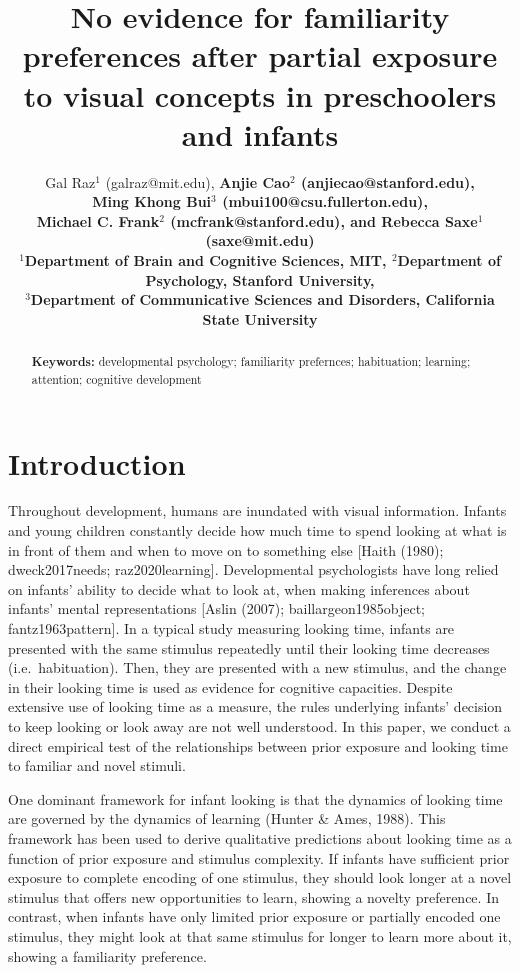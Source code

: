 \documentclass[10pt, letterpaper]{article}
\title{No evidence for familiarity preferences after partial exposure to
visual concepts in preschoolers and infants}
\author{Gal Raz$^1$ (galraz@mit.edu), \bf{Anjie Cao$^2$  (anjiecao@stanford.edu)},\\ \bf{Ming Khong Bui$^3$  (mbui100@csu.fullerton.edu)},\\ \bf{Michael C. Frank$^2$ (mcfrank@stanford.edu)},
 and \bf{Rebecca Saxe$^1$ (saxe@mit.edu)} \\
$^1$Department of Brain and Cognitive Sciences, MIT, $^2$Department of Psychology, Stanford University, \\ $^3$Department of Communicative Sciences and Disorders, California State University \\
}
\begin{document}
\maketitle

\begin{abstract}


\textbf{Keywords:}
developmental psychology; familiarity prefernces; habituation; learning;
attention; cognitive development
\end{abstract}

\hypertarget{introduction}{%
\section{Introduction}\label{introduction}}

Throughout development, humans are inundated with visual information.
Infants and young children constantly decide how much time to spend
looking at what is in front of them and when to move on to something
else {[}Haith (1980); dweck2017needs; raz2020learning{]}. Developmental
psychologists have long relied on infants' ability to decide what to
look at, when making inferences about infants' mental representations
{[}Aslin (2007); baillargeon1985object; fantz1963pattern{]}. In a
typical study measuring looking time, infants are presented with the
same stimulus repeatedly until their looking time decreases
(i.e.~habituation). Then, they are presented with a new stimulus, and
the change in their looking time is used as evidence for cognitive
capacities. Despite extensive use of looking time as a measure, the
rules underlying infants' decision to keep looking or look away are not
well understood. In this paper, we conduct a direct empirical test of
the relationships between prior exposure and looking time to familiar
and novel stimuli.

One dominant framework for infant looking is that the dynamics of
looking time are governed by the dynamics of learning (Hunter \& Ames,
1988). This framework has been used to derive qualitative predictions
about looking time as a function of prior exposure and stimulus
complexity. If infants have sufficient prior exposure to complete
encoding of one stimulus, they should look longer at a novel stimulus
that offers new opportunities to learn, showing a novelty preference. In
contrast, when infants have only limited prior exposure or partially
encoded one stimulus, they might look at that same stimulus for longer
to learn more about it, showing a familiarity preference.
\end{document}
